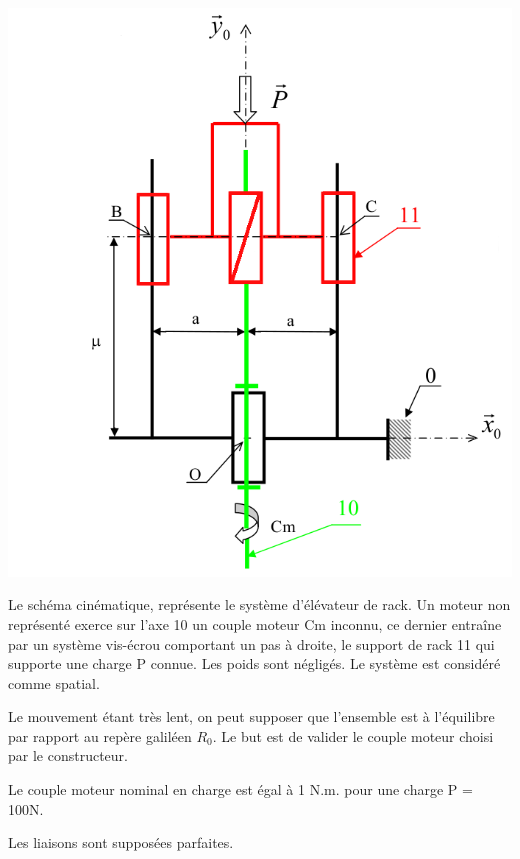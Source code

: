 \begin{minipage}{0.3\linewidth}
  \centering\includegraphics[width=\linewidth]{img/colleuse_cin.png}
\end{minipage}
  \hfill
\begin{minipage}{0.6\linewidth}
Le schéma cinématique, représente le système d'élévateur de rack. Un moteur non représenté exerce sur l'axe 10 un couple moteur Cm inconnu, ce dernier entraîne par un système vis-écrou comportant un pas à droite, le support de rack 11 qui supporte une charge P connue. Les poids sont négligés. Le système est considéré comme spatial.

Le mouvement étant très lent, on peut supposer que l'ensemble est à l'équilibre par rapport au repère galiléen $R_0$. Le but est de valider le couple moteur choisi par le constructeur.
\end{minipage}

Le couple moteur nominal en charge est égal à 1 N.m. pour une charge P = 100N.

Les liaisons sont supposées parfaites.

